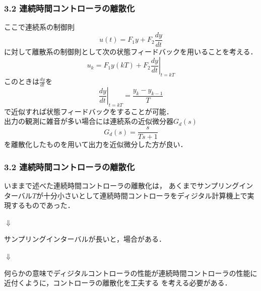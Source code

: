 \begin{frame}[t]
\frametitle{3.2 連続時間コントローラの離散化}
ここで連続系の制御則
\begin{equation}
 u(t) = F_1 y + F_2 \frac{dy}{dt} \tag{3.12}
\end{equation}
に対して離散系の制御則として次の状態フィードバックを用いることを考える．
\begin{equation}
 u_k = F_1 y(kT) + F_2 \left.\frac{dy}{dt} \right\vert_{t = kT}
\end{equation}
このときは$\frac{dy}{dt}$を
\begin{equation}
 \left.\frac{dy}{dt}\right\vert_{t = kT} = \frac{y_k - y_{k-1}}{T}
\end{equation}
で近似すれば状態フィードバックをすることが可能．\\
出力の観測に雑音が多い場合には連続系の近似微分器$G_d(s)$
\begin{equation}
 G_d(s) = \frac{s}{Ts + 1}
\end{equation}
を離散化したものを用いて出力を近似微分した方が良い．
\end{frame}


\begin{frame}[t]
\frametitle{3.2 連続時間コントローラの離散化}
いままで述べた連続時間コントローラの離散化は，
あくまでサンプリングインターバル$T$が十分小さいとして連続時間コントローラをディジタル計算機上で実現するものであった．

\hspace*{2cm}
$\Downarrow$ 

サンプリングインターバルが長いと，場合がある．

\hspace*{2cm}
$\Downarrow$ 

何らかの意味でディジタルコントローラの性能が連続時間コントローラの性能に近付くように，コントローラの離散化を工夫する を考える必要がある．

\end{frame}
